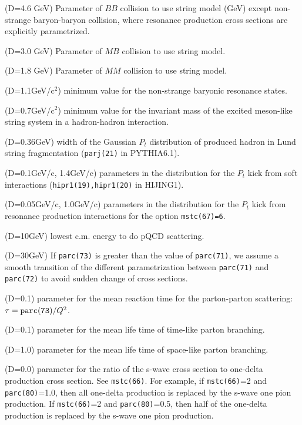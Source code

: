 \documentclass[]{article}
\newenvironment{entry}%
{\begin{list}{}{\setlength{\topsep}{0mm} \setlength{\itemsep}{0mm}
\setlength{\parskip}{0mm} \setlength{\parsep}{0mm}
\setlength{\leftmargin}{20mm} \setlength{\rightmargin}{0mm}
\setlength{\labelwidth}{18mm} \setlength{\labelsep}{2mm}}}%
{\end{list}}
\newcommand{\ttt}[1]{{\tt#1}}
\newcommand{\itemt}[1]{\item[{\tt #1}\hfill]}
\begin{document}
\begin{entry}
\itemt{parc(61) :} (D=4.6 GeV) Parameter of $BB$ collision
   to use string model (GeV) except non-strange baryon-baryon collision,
   where resonance production cross sections are explicitly parametrized.
\itemt{parc(62) :} (D=3.0 GeV) Parameter of $MB$ collision
                                    to use string model.
\itemt{parc(63) :} (D=1.8 GeV) Parameter of $MM$ collision
                                  to use string model.
\itemt{parc(64) :} (D=1.1GeV/c$^2$) minimum value for the non-strange
                                     baryonic resonance states.
\itemt{parc(65) :} (D=0.7GeV/c$^2$) minimum value for the invariant mass
                  of the excited meson-like string system
                 in a hadron-hadron interaction.
\itemt{parc(66) :} (D=0.36GeV) width of the Gaussian $P_t$ distribution of
                   produced hadron in Lund string fragmentation 
                   (\ttt{parj(21)} in PYTHIA6.1).
\itemt{parc(67), parc(68) :} (D=0.1GeV/c, 1.4GeV/c)
     parameters in the distribution for the $P_t$ kick from soft interactions
      (\ttt{hipr1(19),hipr1(20)} in HIJING1).
\itemt{parc(69), parc(70) :} (D=0.05GeV/c, 1.0GeV/c)
     parameters in the distribution for the $P_t$ kick from resonance
    production interactions for the option \ttt{mstc(67)=6}.


\itemt{parc(71) :} (D=10GeV) lowest c.m. energy  to do pQCD scattering.
 
\itemt{parc(72) :} (D=30GeV) If \ttt{parc(73)} is greater than the value
of \ttt{parc(71)}, we assume a smooth transition 
of the different parametrization
between \ttt{parc(71)} and \ttt{parc(72)}
to avoid sudden change of cross sections.

\itemt{parc(73) :} (D=0.1) parameter for the mean reaction time for the
           parton-parton scattering: $\tau=\ttt{parc(73)}/Q^2$.
\itemt{parc(74) :} (D=0.1) parameter for the mean life time of time-like
           parton branching.
\itemt{parc(75) :} (D=1.0) parameter for the mean life time of space-like parton
           branching.

\itemt{parc(80) :} (D=0.0) parameter for the ratio of the s-wave cross section
 to one-delta production cross section. See \ttt{mstc(66)}.
 For example, if \ttt{mstc(66)}=2 and \ttt{parc(80)}=1.0, then
 all one-delta production is replaced by the s-wave one pion production.
 If \ttt{mstc(66)}=2 and \ttt{parc(80)}=0.5, then
 half of the one-delta production is replaced by the s-wave one pion production.


\end{entry}
\end{document}
